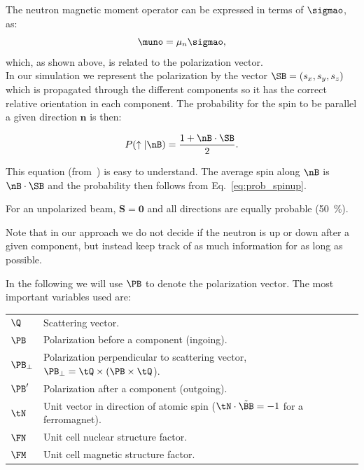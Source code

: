The neutron magnetic moment operator can be expressed in terms of $\sigmao$,
as:
\begin{equation}
  \label{eq:magnetic}
  \muno = \mu_n \sigmao,
\end{equation}
which, as shown above, is related to the polarization vector.  \\

In our simulation we represent the polarization by the vector $\SB = (s_x,
s_y, s_z)$ which is propagated through the different components so it has the
correct relative orientation in each component. The probability for the spin
to be parallel a given direction $\mathbf{n}$ is then:

 \begin{equation}
   \label{eq:probmcstas}
   P(\uparrow|\nB) = \frac{1+\nB \cdot \SB}{2}.
 \end{equation}

This equation (from~\cite{pol_seeger}) is easy to understand. The
average spin along $\nB$ is $\nB \cdot \SB$ and the probability then
follows from Eq.~\ref{eq:prob_spinup}.

For an unpolarized beam, $\mathbf{S} = \mathbf{0}$ and all directions
are equally probable (50~\%).

Note that in our approach we do not decide if the neutron is up or down after
a given component, but instead keep track of as much information for as long
as possible.

In the following we will use $\PB$ to denote the polarization
vector. The most important variables used are:

\begin{tabular}{ll}

  $\Q$  & Scattering vector. \\
  $\PB$  & Polarization before a component (ingoing). \\
  $\PB_\perp$  & Polarization perpendicular to scattering vector,
  $\PB_\perp = \tQ \times (\PB \times \tQ$). \\
  $\PB'$ & Polarization after a component (outgoing). \\
  $\tN$ & Unit vector in direction of atomic spin ($\tN \cdot \tilde{\BB} = -1$ for a ferromagnet). \\
  $\FN$ & Unit cell nuclear structure factor. \\
  $\FM$ & Unit cell magnetic structure factor. \\
\end{tabular}
\\

